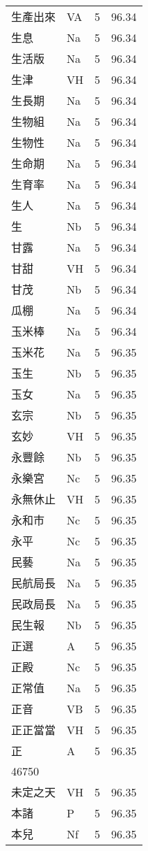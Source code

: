 \documentclass[twocolumn]{book}
\begin{document}
\begin{supertabular}{llrr}
生產出來 & VA & 5 &  96.34\\
生息 & Na & 5 &  96.34\\
生活版 & Na & 5 &  96.34\\
生津 & VH & 5 &  96.34\\
生長期 & Na & 5 &  96.34\\
生物組 & Na & 5 &  96.34\\
生物性 & Na & 5 &  96.34\\
生命期 & Na & 5 &  96.34\\
生育率 & Na & 5 &  96.34\\
生人 & Na & 5 &  96.34\\
生 & Nb & 5 &  96.34\\
甘露 & Na & 5 &  96.34\\
甘甜 & VH & 5 &  96.34\\
甘茂 & Nb & 5 &  96.34\\
瓜棚 & Na & 5 &  96.34\\
玉米棒 & Na & 5 &  96.34\\
玉米花 & Na & 5 &  96.35\\
玉生 & Nb & 5 &  96.35\\
玉女 & Na & 5 &  96.35\\
玄宗 & Nb & 5 &  96.35\\
玄妙 & VH & 5 &  96.35\\
永豐餘 & Nb & 5 &  96.35\\
永樂宮 & Nc & 5 &  96.35\\
永無休止 & VH & 5 &  96.35\\
永和市 & Nc & 5 &  96.35\\
永平 & Nc & 5 &  96.35\\
民藝 & Na & 5 &  96.35\\
民航局長 & Na & 5 &  96.35\\
民政局長 & Na & 5 &  96.35\\
民生報 & Nb & 5 &  96.35\\
正選 & A & 5 &  96.35\\
正殿 & Nc & 5 &  96.35\\
正常值 & Na & 5 &  96.35\\
正音 & VB & 5 &  96.35\\
正正當當 & VH & 5 &  96.35\\
正 & A & 5 &  96.35\\
46750\\
未定之天 & VH & 5 &  96.35\\
本諸 & P & 5 &  96.35\\
本兒 & Nf & 5 &  96.35\\

\end{supertabular}
\end{document}
